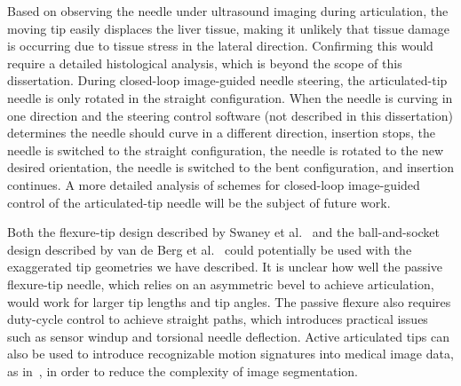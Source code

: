 Based on observing the needle under ultrasound imaging during articulation, the moving tip easily displaces the liver tissue, making it unlikely that tissue damage is occurring due to tissue stress in the lateral direction. Confirming this would require a detailed histological analysis, which is beyond the scope of this dissertation. During closed-loop image-guided needle steering, the articulated-tip needle is only rotated in the straight configuration. When the needle is curving in one direction and the steering control software (not described in this dissertation) determines the needle should curve in a different direction, insertion stops, the needle is switched to the straight configuration, the needle is rotated to the new desired orientation, the needle is switched to the bent configuration, and insertion continues. A more detailed analysis of schemes for closed-loop image-guided control of the articulated-tip needle will be the subject of future work.

Both the flexure-tip design described by Swaney et al.~\cite{Swaney2013} and the ball-and-socket design described by van de Berg et al.~\cite{vandeBerg2015} could potentially be used with the exaggerated tip geometries we have described. It is unclear how well the passive flexure-tip needle, which relies on an asymmetric bevel to achieve articulation, would work for larger tip lengths and tip angles. The passive flexure also requires duty-cycle control to achieve straight paths, which introduces practical issues such as sensor windup and torsional needle deflection. Active articulated tips can also be used to introduce recognizable motion signatures into medical image data, as in~\cite{Adebar2014}, in order to reduce the complexity of image segmentation.

